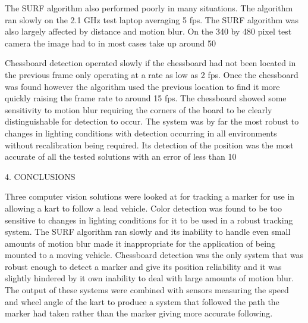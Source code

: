 The SURF algorithm also performed poorly in many situations. The algorithm ran slowly on the 2.1 GHz test laptop averaging 5 fps. The SURF algorithm was also largely affected by distance and motion blur. On the 340 by 480 pixel test camera the image had to in most cases take up around 50%

Chessboard detection operated slowly if the chessboard had not been located in the previous frame only operating at a rate as low as 2 fps. Once the chessboard was found however the algorithm used the previous location to find it more quickly raising the frame rate to around 15 fps. The chessboard showed some sensitivity to motion blur requiring the corners of the board to be clearly distinguishable for detection to occur. The system was by far the most robust to changes in lighting conditions with detection occurring in all environments without recalibration being required. Its detection of the position was the most accurate of all the tested solutions with an error of less than 10 %

4.	CONCLUSIONS

Three computer vision solutions were looked at for tracking a marker for use in allowing a kart to follow a lead vehicle. Color detection was found to be too sensitive to changes in lighting conditions for it to be used in a robust tracking system. The SURF algorithm ran slowly and its inability to handle even small amounts of motion blur made it inappropriate for the application of being mounted to a moving vehicle. Chessboard detection was the only system that was robust enough to detect a marker and give its position reliability and it was slightly hindered by it own inability to deal with large amounts of motion blur. The output of these systems were combined with sensors measuring the speed and wheel angle of the kart to produce a system that followed the path the marker had taken rather than the marker giving more accurate following. 